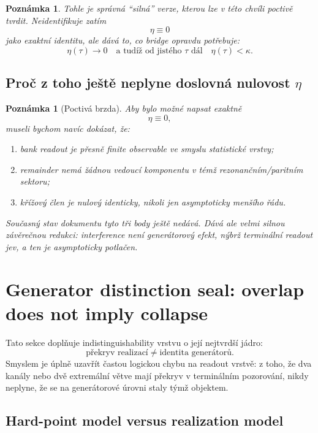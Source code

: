 \documentclass[11pt,a4paper]{article}
\newtheorem{remark}[theorem]{Poznámka}
\begin{document}
\begin{remark}
Tohle je správná ``silná'' verze, kterou lze v této chvíli poctivě tvrdit.
Neidentifikuje zatím
\[
\eta\equiv 0
\]
jako exaktní identitu, ale dává to, co bridge opravdu potřebuje:
\[
\eta(\tau)\to 0
\quad\text{a tudíž od jistého }\tau\text{ dál}\quad
\eta(\tau)<\kappa.
\]
\end{remark}

\subsection*{Proč z toho ještě neplyne doslovná nulovost \(\eta\)}

\begin{remark}[Poctivá brzda]
Aby bylo možné napsat exaktně
\[
\eta\equiv 0,
\]
museli bychom navíc dokázat, že:
\begin{enumerate}[label=\textbf{(\arabic*)}]
    \item bank readout je přesně finite observable ve smyslu statistické vrstvy;
    \item remainder nemá žádnou vedoucí komponentu v témž rezonančním/paritním sektoru;
    \item křížový člen je nulový identicky, nikoli jen asymptoticky menšího řádu.
\end{enumerate}
Současný stav dokumentu tyto tři body ještě nedává. Dává ale velmi silnou závěrečnou redukci:
interference není generátorový efekt, nýbrž terminální readout jev, a ten je asymptoticky
potlačen.
\end{remark}



\section{Generator distinction seal: overlap does not imply collapse}

Tato sekce doplňuje indistinguishability vrstvu o její nejtvrdší jádro:
\[
\text{překryv realizací} \neq \text{identita generátorů}.
\]
Smyslem je úplně uzavřít častou logickou chybu na readout vrstvě:
z toho, že dva kanály nebo dvě extremální větve mají překryv v terminálním pozorování,
nikdy neplyne, že se na generátorové úrovni staly týmž objektem.

\subsection*{Hard-point model versus realization model}
\end{document}
